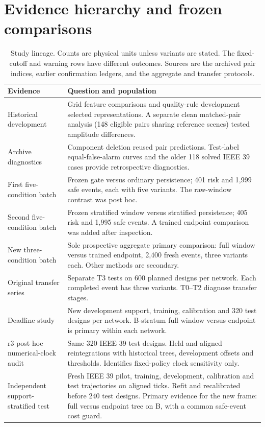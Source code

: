 \documentclass[10pt]{article}
\begin{document}
\section{Evidence hierarchy and frozen comparisons}
\begin{table}[htbp]\centering\small
\caption{Study lineage. Counts are physical units unless variants are stated. The fixed-cutoff and warning rows have different outcomes. Sources are the archived pair indices, earlier confirmation ledgers, and the aggregate and transfer protocols.}\label{tab:lineage}
\begin{tabularx}{\linewidth}{@{}p{.24\linewidth}X@{}}\toprule Evidence & Question and population\\\midrule
Historical development & Grid feature comparisons and quality-rule development selected representations. A separate clean matched-pair analysis (148 eligible pairs sharing reference scenes) tested amplitude differences.\\
Archive diagnostics & Component deletion reused pair predictions. Test-label equal-false-alarm curves and the older 118 solved IEEE 39 cases provide retrospective diagnostics.\\
First five-condition batch & Frozen gate versus ordinary persistence; 401 risk and 1,999 safe events, each with five variants. The raw-window contrast was post hoc.\\
Second five-condition batch & Frozen stratified window versus stratified persistence; 405 risk and 1,995 safe events. A trained endpoint comparison was added after inspection.\\
New three-condition batch & Sole prospective aggregate primary comparison: full window versus trained endpoint, 2,400 fresh events, three variants each. Other methods are secondary.\\
Original transfer series & Separate T3 tests on 600 planned designs per network. Each completed event has three variants. T0--T2 diagnose transfer stages.\\
Deadline study & New development support, training, calibration and 320 test designs per network. B-stratum full window versus endpoint is primary within each network.\\
r3 post hoc numerical-clock audit & Same 320 IEEE 39 test designs. Held and aligned reintegrations with historical trees, development offsets and thresholds. Identifies fixed-policy clock sensitivity only.\\
Independent support-stratified test & Fresh IEEE 39 pilot, training, development, calibration and test trajectories on aligned ticks. Refit and recalibrated before 240 test designs. Primary evidence for the new frame: full versus endpoint tree on B, with a common safe-event cost guard.\\\bottomrule
\end{tabularx}\end{table}
\end{document}
